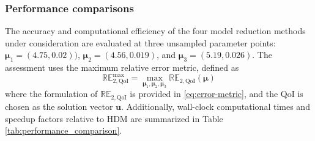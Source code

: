 \documentclass[preprint,10pt]{elsarticle}
\begin{document}
\subsubsection{Performance comparisons}

The accuracy and computational efficiency of the four model reduction methods under consideration are evaluated at three unsampled 
parameter points: $\boldsymbol{\mu}_1 = (4.75, 0.02))$, $\boldsymbol{\mu}_2 = (4.56, 0.019)$, and $\boldsymbol{\mu}_3 = (5.19, 0.026)$.
The assessment uses the maximum relative error metric, defined as
\begin{equation*} 
	\mathbb{RE}_{2, \text{QoI}}^{\max} = \max_{\boldsymbol{\mu}_1, \boldsymbol{\mu}_2, \boldsymbol{\mu}_3} 
	\mathbb{RE}_{2, \text{QoI}} (\boldsymbol{\mu})
\end{equation*}
where the formulation of $\mathbb{RE}_{2, \text{QoI}}$ is provided in \eqref{eq:error-metric}, and the QoI is chosen as the solution 
vector $\mathbf{u}$. Additionally, wall-clock computational times and speedup factors relative to HDM are summarized in Table 
\ref{tab:performance_comparison}.

\begin{table}[!htbp]
\centering
{}
\caption{Online performance comparison (accuracy and computational speedups) of traditional and nonlinear HPROMs for the 2D parametric inviscid Burgers' problem.}
\label{tab:performance_comparison}
\end{table}
\end{document}
